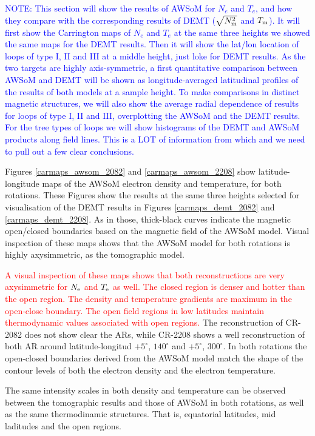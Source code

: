 \documentclass[namedreferences]{solarphysics}
\newcommand{\mdeg}{^\circ}
\newcommand{\Te}{T_{\rm e}}
\newcommand{\Tm}{T_{\rm m}}
\newcommand{\Ne}{N_{\rm e}}
\newcommand{\Nsqm}{N^2_{{\rm m}}}
\newcommand{\sqravgN}{\sqrt{\Nsqm}}
\def\diego#1{\textcolor{red}{#1}}
\def\notebyalbert#1{\textcolor{blue}{NOTE: #1}}
\begin{document}
\begin{article}
\noindent\notebyalbert{This section will show the results of AWSoM for $N_e$ and $T_e$, and how they compare with the corresponding results of DEMT ($\sqravgN$ and $\Tm$). It will first show the Carrington maps of $N_e$ and $T_e$ at the same three heights we showed the same maps for the DEMT results. Then it will show the lat/lon location of loops of type I, II and III at a middle height, just loke for DEMT results. As the two targets are highly axis-symmetric, a first quantitative comparison between AWSoM and DEMT will be shown as longitude-averaged latitudinal profiles of the results of both models at a sample height. To make comparisons in distinct magnetic structures, we will also show the average radial dependence of results for loops of type I, II and III, overplotting the AWSoM and the DEMT results. For the tree types of loops we will show histograms of the DEMT and AWSoM products along field lines. This is a LOT of information from which and we need to pull out a few clear conclusions.}

Figures \ref{carmaps_awsom_2082} and \ref{carmaps_awsom_2208} show latitude-longitude maps of the AWSoM electron density and temperature, for both rotations. These Figures show the results at the same three heights selected for visualisation of the DEMT results in Figures \ref{carmaps_demt_2082} and \ref{carmaps_demt_2208}. As in those, thick-black curves indicate the magnetic open/closed boundaries based on the magnetic field of the AWSoM model. Visual inspection of these maps shows that the AWSoM model for both rotations is highly axysimmetric, as the tomographic model.


\diego{A visual inspection of these maps shows that both reconstructions are very axysimmetric for $\Ne$ and $\Te$ as well. The closed region is denser and hotter than the open region. The density and temperature gradients are maximum in the open-close boundary. The open field regions in low latitudes maintain thermodynamic values associated with open regions.} The reconstruction of CR-2082 does not show clear the ARs, while CR-2208 shows a well reconstruction of both AR around latitude-longitud $+5\mdeg$, $140\mdeg$ and $+5\mdeg$, $300\mdeg$. In both rotations the open-closed boundaries derived from the AWSoM model match the shape of the contour levels of both the electron density and the electron temperature.


The same intensity scales in both density and temperature can be observed between the tomographic results and those of AWSoM in both rotations, as well as the same thermodinamic structures. That is, equatorial latitudes, mid laditudes and the open regions.


\end{article}
\end{document}
